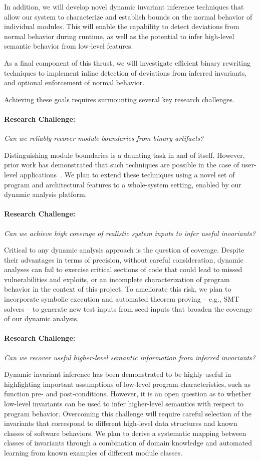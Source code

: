 \documentclass[letterpaper,twoside,11pt,headings=small]{scrartcl}
\newcommand{\challenge}[1]{\paragraph{Research Challenge:} \emph{#1}}
\begin{document}
In addition, we will develop novel dynamic invariant inference techniques that
allow our system to characterize and establish bounds on the normal behavior
of individual modules.  This will enable the capability to detect deviations
from normal behavior during runtime, as well as the potential to infer high-level
semantic behavior from low-level features.

As a final component of this thrust, we will investigate efficient binary
rewriting techniques to implement inline detection of deviations from inferred
invariants, and optional enforcement of normal behavior.

Achieving these goals requires surmounting several key research challenges.

\challenge{Can we reliably recover module boundaries from binary artifacts?}

Distinguishing module boundaries is a daunting task in and of itself.  However,
prior work has demonstrated that such techniques are possible in the case of
user-level applications~\cite{bittau:nsdi2008:wedge}.  We plan to extend these
techniques using a novel set of program and architectural features to a whole-system
setting, enabled by our dynamic analysis platform.

\challenge{Can we achieve high coverage of realistic system inputs to infer useful invariants?}

Critical to any dynamic analysis approach is the question of coverage. Despite
their advantages in terms of precision, without careful consideration, dynamic
analyses can fail to exercise critical sections of code that could lead to
missed vulnerabilities and exploits, or an incomplete characterization of
program behavior in the context of this project.  To ameliorate this risk, we
plan to incorporate symbolic execution and automated theorem proving -- e.g.,
SMT solvers -- to generate new test inputs from seed inputs that broaden the
coverage of our dynamic analysis.

\challenge{Can we recover useful higher-level semantic information from inferred invariants?}

Dynamic invariant inference has been demonstrated to be highly useful in
highlighting important assumptions of low-level program characteristics, such
as function pre- and post-conditions.  However, it is an open question as to
whether low-level invariants can be used to infer higher-level semantics with
respect to program behavior.  Overcoming this challenge will require careful
selection of the invariants that correspond to different high-level data
structures and known classes of software behaviors.  We plan to derive a
systematic mapping between classes of invariants through a combination of
domain knowledge and automated learning from known examples of different
module classes.
\end{document}

